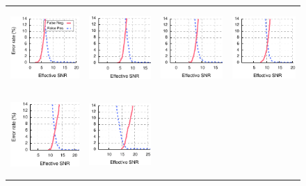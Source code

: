 \begin{figure}[p]
	\begin{xtrafullpage}
	\centering
	\begin{tabular}{cccc}
	\includegraphics[height=1.2in]{figures/delivery/goodbad/esnr_goodbad_0.pdf} &
	\includegraphics[height=1.2in]{figures/delivery/goodbad/esnr_goodbad_1.pdf} &
	\includegraphics[height=1.2in]{figures/delivery/goodbad/esnr_goodbad_2.pdf} &
	\includegraphics[height=1.2in]{figures/delivery/goodbad/esnr_goodbad_3.pdf} \\
	\includegraphics[height=1.2in]{figures/delivery/goodbad/esnr_goodbad_4.pdf} &
	\includegraphics[height=1.2in]{figures/delivery/goodbad/esnr_goodbad_5.pdf} &

\end{tabular}
\end{xtrafullpage}
\end{figure}
